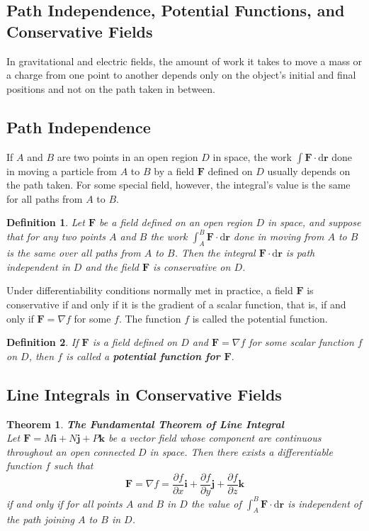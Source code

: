 \documentclass[a4paper,12pt]{article}
\newtheorem{theorem}{Theorem}[section]  %
\newtheorem{definition}{Definition}
\begin{document}
\begin{CJK}{UTF8}{gbsn}
\section{Path Independence, Potential Functions, and Conservative 
Fields}

In gravitational and electric fields, the amount of work 
it takes to move a mass or a charge from one point to 
another depends only on the object's initial and final 
positions and not on the path taken in between.

\subsection{Path Independence}
If $A$ and $B$ are two points in an open region $D$ in space, 
the work $\int\bm{F}\cdot\mathrm{d}\bm{r}$ done in moving a 
particle from $A$ to $B$ by a field $\bm{F}$ defined on $D$ 
usually depends on the path taken. For some special 
field, however, the integral's value is the same for all
paths from $A$ to $B$.

\begin{definition}
    Let $\bm{F}$ be a field defined on an open region $D$ in 
    space, and suppose that for any two points $A$ and $B$
    the work $\int_A^B \bm{F} \cdot \mathrm{d}\bm{r}$ done in 
    moving from $A$ to $B$ is the same over all paths from
    $A$ to $B$. Then the integral $\bm{F} \cdot \mathrm{d}\bm{r}$
    is path independent in $D$ and the field $\bm{F}$ is 
    conservative on $D$.
\end{definition}

Under differentiability conditions normally met in practice,
a field $\bm{F}$ is conservative if and only if it is 
the gradient of a scalar function, that is, if and only 
if $\bm{F} = \nabla f$ for some $f$. The function $f$ 
is called the potential function.

\begin{definition}
    If $\bm{F}$ is a field defined on $D$ and $\bm{F} = \nabla f$
    for some scalar function $f$ on $D$, then $f$ is called 
    a \textbf{potential function for $\bm{F}.$}
\end{definition}
\subsection{Line Integrals in Conservative Fields}
\begin{theorem}{\rm \textbf{The Fundamental Theorem of Line Integral}}\\
    Let $\bm{F} = M\bm{i} + N\bm{j} + P\bm{k}$ be a vector 
    field whose component are continuous throughout an 
    open connected $D$ in space. Then there exists a 
    differentiable function $f$ such that 
    \[
        \bm{F} = \nabla f = \frac{\partial f}{\partial x}\bm{i} + 
        \frac{\partial f}{\partial y}\bm{j} + \frac{\partial f}{\partial z}
        \bm{k}
    \]
    if and only if for all points $A$ and $B$ in $D$ the
    value of $\int_A ^B\bm{F} \cdot \mathrm{d}\bm{r}$
    is independent of the path joining $A$ to $B$ in $D$.


\end{theorem}
\end{CJK}
\end{document}
